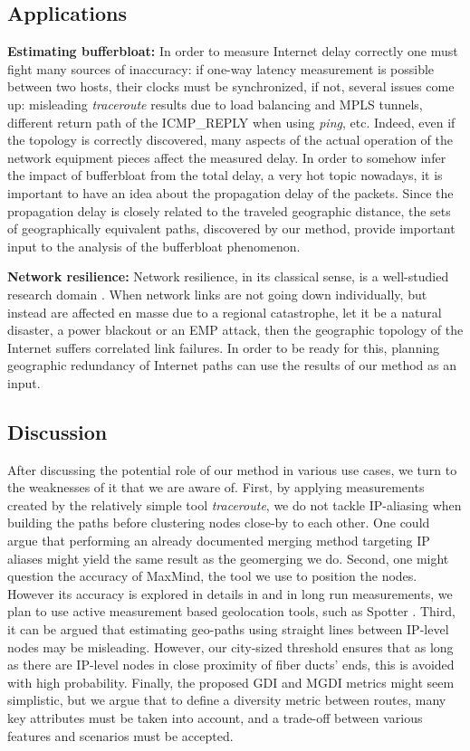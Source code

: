 \documentclass[peerreview]{IEEEtran}
\begin{document}
\subsection{Applications}
\label{sec:applications}
\textbf{Estimating bufferbloat:} In order to measure Internet delay correctly
one must fight many sources of inaccuracy: if one-way latency measurement is
possible between two hosts, their clocks must be synchronized, if not, several
issues come up: misleading \textit{traceroute} results due to load balancing and
MPLS tunnels, different return path of the ICMP\_REPLY when using \textit{ping},
etc. Indeed, even if the topology is correctly discovered, many aspects of the
actual operation of the network equipment pieces affect the measured delay. In
order to somehow infer the impact of bufferbloat from the total delay, a very
hot topic nowadays, it is important to have an idea about the propagation delay
of the packets. Since the propagation delay is closely related to the traveled
geographic distance, the sets of geographically equivalent paths, discovered by
our method, provide important input to the analysis of the bufferbloat
phenomenon.

\textbf{Network resilience:} Network resilience, in its classical sense, is a
well-studied research domain \cite{najjar1990network}. When network links are
not going down individually, but instead are affected en masse due to a regional
catastrophe, let it be a natural disaster, a power blackout or an EMP attack,
then the geographic topology of the Internet suffers correlated link failures.
In order to be ready for this, planning geographic redundancy of Internet paths
can use the results of our method as an input.


\subsection{Discussion} 

After discussing the potential role of our method in various use cases, we turn
to the weaknesses of it that we are aware of. First, by applying measurements
created by the relatively simple tool \textit{traceroute}, we do not tackle
IP-aliasing when building the paths before clustering nodes close-by to each
other. One could argue that performing an already documented merging method
targeting IP aliases might yield the same result as the geomerging we do.
Second, one might question the accuracy of MaxMind, the tool we use to position
the nodes. However its accuracy is explored in details in \cite{geocompare} and
in long run measurements, we plan to use active measurement based geolocation
tools, such as Spotter \cite{matray_spatial_2012}. Third, it can be argued that
estimating geo-paths using straight lines between IP-level nodes may be
misleading. However, our city-sized threshold ensures that as long as there are
IP-level nodes in close proximity of fiber ducts' ends, this is avoided with
high probability. Finally, the proposed GDI and MGDI metrics might seem
simplistic, but we argue that to define a diversity metric between routes, many
key attributes must be taken into account, and a trade-off between various
features and scenarios must be accepted.



\end{document}
